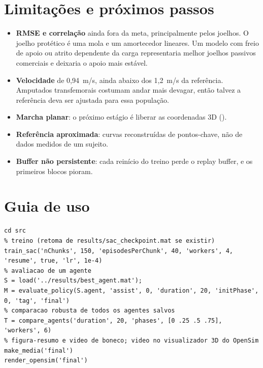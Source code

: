 \documentclass[11pt,a4paper]{article}
\begin{document}
\section{Limitações e próximos passos}
\begin{itemize}
  \item \textbf{RMSE e correlação} ainda fora da meta, principalmente pelos joelhos. O joelho protético
        é uma mola e um amortecedor lineares. Um modelo com freio de apoio ou atrito dependente da carga
        representaria melhor joelhos passivos comerciais e deixaria o apoio mais estável.
  \item \textbf{Velocidade} de 0{,}94~m/s, ainda abaixo dos 1{,}2~m/s da referência. Amputados
        transfemorais costumam andar mais devagar, então talvez a referência deva ser ajustada para essa
        população.
  \item \textbf{Marcha planar}: o próximo estágio é liberar as coordenadas 3D ().
  \item \textbf{Referência aproximada}: curvas reconstruídas de pontos-chave, não de dados medidos de um
        sujeito.
  \item \textbf{Buffer não persistente}: cada reinício do treino perde o replay buffer, e os primeiros
        blocos pioram.
\end{itemize}

\section{Guia de uso}
\begin{lstlisting}[numbers=none]
cd src
% treino (retoma de results/sac_checkpoint.mat se existir)
train_sac('nChunks', 150, 'episodesPerChunk', 40, 'workers', 4, 'resume', true, 'lr', 1e-4)
% avaliacao de um agente
S = load('../results/best_agent.mat');
M = evaluate_policy(S.agent, 'assist', 0, 'duration', 20, 'initPhase', 0, 'tag', 'final')
% comparacao robusta de todos os agentes salvos
T = compare_agents('duration', 20, 'phases', [0 .25 .5 .75], 'workers', 6)
% figura-resumo e video de boneco; video no visualizador 3D do OpenSim
make_media('final')
render_opensim('final')
\end{lstlisting}
\end{document}
